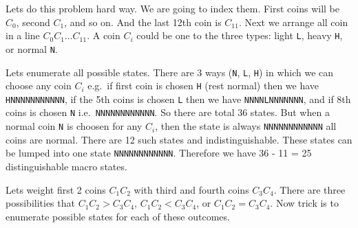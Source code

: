 \documentclass[answers]{exam}
\begin{document}
\begin{questions}
\begin{solution}
Lets do this problem hard way. We are going to index them. First coins
will be \(C_0\), second \(C_1\), and so on. And the last 12th coin is
\(C_{11}\). Next we arrange all coin in a line
\(C_0 C_1 \ldots C_{11}\). A coin \(C_i\) could be one to the three
types: light \texttt{L}, heavy \texttt{H}, or normal \texttt{N}.

Lets enumerate all possible states. There are 3 ways (\texttt{N},
\texttt{L}, \texttt{H}) in which we can choose any coin \(C_i\) e.g.~if
first coin is chosen \texttt{H} (rest normal) then we have
\texttt{HNNNNNNNNNNN}, if the 5th coins is chosen \texttt{L} then we
have \texttt{NNNNLNNNNNNN}, and if 8th coins is chosen \texttt{N}
i.e.~\texttt{NNNNNNNNNNNN}. So there are total 36 states. But when a
normal coin \texttt{N} is choosen for any \(C_i\), then the state is
always \texttt{NNNNNNNNNNNN} all coins are normal. There are 12 such
states and indistinguishable. These states can be lumped into one state
\texttt{NNNNNNNNNNNN}. Therefore we have 36 - 11 = 25 distinguishable
macro states.

Lets weight first 2 coins \(C_1C_2\) with third and fourth coins
\(C_3C_4\). There are three possibilities that \(C_1C_2 > C_3C_4\),
\(C_1C_2 < C_3C_4\), or \(C_1C_2 = C_3C_4\). Now trick is to enumerate
possible states for each of these outcomes.
\end{solution}

\end{questions}
\end{document}
